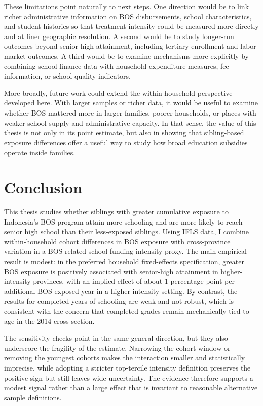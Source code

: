 \documentclass[a4paper, 12pt]{article}
\begin{document}
\begin{doublespacing}
These limitations point naturally to next steps. One direction would be to link richer administrative information on BOS disbursements, school characteristics, and student histories so that treatment intensity could be measured more directly and at finer geographic resolution. A second would be to study longer-run outcomes beyond senior-high attainment, including tertiary enrollment and labor-market outcomes. A third would be to examine mechanisms more explicitly by combining school-finance data with household expenditure measures, fee information, or school-quality indicators.

More broadly, future work could extend the within-household perspective developed here. With larger samples or richer data, it would be useful to examine whether BOS mattered more in larger families, poorer households, or places with weaker school supply and administrative capacity. In that sense, the value of this thesis is not only in its point estimate, but also in showing that sibling-based exposure differences offer a useful way to study how broad education subsidies operate inside families.

\section{Conclusion}
This thesis studies whether siblings with greater cumulative exposure to Indonesia's BOS program attain more schooling and are more likely to reach senior high school than their less-exposed siblings. Using IFLS data, I combine within-household cohort differences in BOS exposure with cross-province variation in a BOS-related school-funding intensity proxy. The main empirical result is modest: in the preferred household fixed-effects specification, greater BOS exposure is positively associated with senior-high attainment in higher-intensity provinces, with an implied effect of about 1 percentage point per additional BOS-exposed year in a higher-intensity setting. By contrast, the results for completed years of schooling are weak and not robust, which is consistent with the concern that completed grades remain mechanically tied to age in the 2014 cross-section.

The sensitivity checks point in the same general direction, but they also underscore the fragility of the estimate. Narrowing the cohort window or removing the youngest cohorts makes the interaction smaller and statistically imprecise, while adopting a stricter top-tercile intensity definition preserves the positive sign but still leaves wide uncertainty. The evidence therefore supports a modest signal rather than a large effect that is invariant to reasonable alternative sample definitions.


\end{doublespacing}
\end{document}
